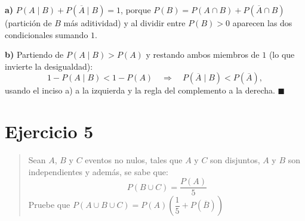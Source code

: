 \documentclass[11pt]{article}
\begin{document}
\begin{resp}
\textbf{a)} $P(A\mid B)+P(\overline{A}\mid B)=1$, porque
$P(B)=P(A\cap B)+P(\overline{A}\cap B)$ (partición de $B$ más aditividad) y al dividir entre
$P(B)>0$ aparecen las dos condicionales sumando $1$.

\textbf{b)} Partiendo de $P(A\mid B)>P(A)$ y restando ambos miembros de $1$ (lo que invierte
la desigualdad):
\[
1-P(A\mid B)<1-P(A)
\quad\Longrightarrow\quad
P(\overline{A}\mid B)<P(\overline{A}),
\]
usando el inciso a) a la izquierda y la regla del complemento a la derecha. $\blacksquare$
\end{resp}

\section*{Ejercicio 5}

\begin{quote}
Sean $A$, $B$ y $C$ eventos no nulos, tales que $A$ y $C$ son disjuntos, $A$ y $B$ son independientes y además, se sabe que:
\[
P(B\cup C)=\frac{P(A)}{5}
\]
Pruebe que $P(A\cup B\cup C)=P(A)\left(\dfrac{1}{5}+P(\overline{B})\right)$
\end{quote}
\end{document}
